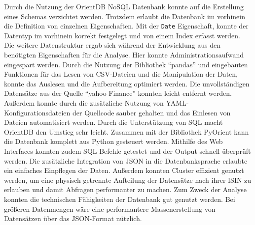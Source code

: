 Durch die Nutzung der OrientDB NoSQL Datenbank konnte auf die Erstellung eines Schemas verzichtet werden. Trotzdem erlaubt die Datenbank im vorhinein die Definition von einzelnen Eigenschaften. Mit der \texttt{Date} Eigenschaft, konnte der Datentyp im vorhinein korrekt festgelegt und von einem Index erfasst werden. Die weitere Datenstruktur ergab sich während der Entwicklung aus den benötigten Eigenschaften für die Analyse. Hier konnte Administrationsaufwand eingespart werden. Durch die Nutzung der Bibliothek \enquote{pandas} und eingebauten Funktionen für das Lesen von \gls{CSV}-Dateien und die Manipulation der Daten, konnte das Auslesen und die Aufbereitung optimiert werden. Die unvollständigen Datensätze aus der Quelle \enquote{yahoo Finance} konnten leicht entfernt werden. Außerdem konnte durch die zusätzliche Nutzung von \gls{YAML}-Konfigurationsdateien der Quellcode sauber gehalten und das Einlesen von Dateien automatisiert werden. Durch die Unterstützung von \gls{SQL} macht OrientDB den Umstieg sehr leicht. Zusammen mit der Bibliothek PyOrient kann die Datenbank komplett aus Python gesteuert werden. Mithilfe des Web Interfaces konnten zudem \gls{SQL} Befehle getestet und der Output schnell überprüft werden. Die zusätzliche Integration von \gls{JSON} in die Datenbanksprache erlaubte ein einfaches Einpflegen der Daten. Außerdem konnten Cluster effizient genutzt werden, um eine physisch getrennte Aufteilung der Datensätze nach ihrer \gls{ISIN} zu erlauben und damit Abfragen performanter zu machen. Zum Zweck der Analyse konnten die technischen Fähigkeiten der Datenbank gut genutzt werden. Bei größeren Datenmengen wäre eine performantere Massenerstellung von Datensätzen über das \gls{JSON}-Format nützlich.


\clearpage